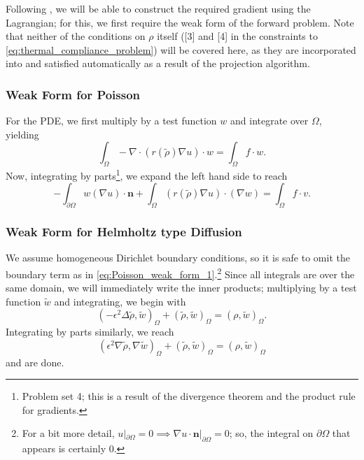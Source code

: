Following \cite{ghattas_willcox_2021}, we will be able to construct the required gradient using the Lagrangian; 
for this, we first require
the weak form of the forward problem. Note that neither of the conditions
on $\rho$ itself ([3] and [4] in the constraints to \autoref{eq:thermal_compliance_problem}) will be covered
here, as they are incorporated into and satisfied automatically as a result of the projection algorithm.

\subsubsection{Weak Form for Poisson}

For the PDE, we first multiply by a test
function $w$ and integrate over $\Omega$, yielding
\begin{equation}
    \int_\Omega - \nabla \cdot (r(\tilde{\rho}) \nabla u) \cdot w = \int_\Omega f \cdot w.
\end{equation}
Now, integrating by parts\footnote{Problem set 4; this is a result of the divergence theorem and the product rule for gradients.},
we expand the left hand side to reach
\begin{equation}\label{eq:Poisson_weak_form_1}
    -\int_{\partial \Omega} w(\nabla u) \cdot \mathbf{n} + \int_\Omega (r(\tilde{\rho})\nabla u) \cdot (\nabla w) = \int_\Omega f \cdot v.
\end{equation}

\subsubsection{Weak Form for Helmholtz type Diffusion}

We assume homogeneous Dirichlet boundary conditions, so it is safe to omit the boundary term as in \autoref{eq:Poisson_weak_form_1}.\footnote{
For a bit more detail, $u |_{\partial\Omega} = 0 \implies \nabla u \cdot \mathbf{n} |_{\partial\Omega} = 0$;
so, the integral on $\partial\Omega$ that appears is certainly $0$.} Since all integrals are over the same domain, we will
immediately write the inner products; multiplying by a test function $\tilde{w}$ and integrating, we begin with
\begin{equation}
    (-\epsilon^2 \Delta \tilde{\rho}, \tilde{w})_\Omega + (\tilde{\rho}, \tilde{w})_\Omega = (\rho, \tilde{w})_\Omega.
\end{equation}
Integrating by parts similarly, we reach
\begin{equation}
    (\epsilon^2 \nabla \tilde{\rho}, \nabla \tilde{w})_\Omega + (\tilde{\rho}, \tilde{w})_\Omega = (\rho, \tilde{w})_\Omega
\end{equation}
and are done.

